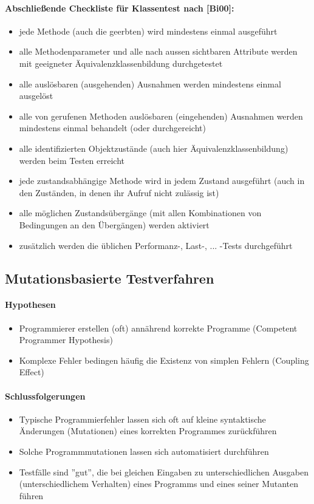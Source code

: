 \paragraph{Abschließende Checkliste für Klassentest nach [Bi00]:}
\begin{itemize}
	\item jede Methode (auch die geerbten) wird mindestens einmal ausgeführt
	\item  alle Methodenparameter und alle nach aussen sichtbaren Attribute werden mit geeigneter Äquivalenzklassenbildung durchgetestet
	\item alle auslösbaren (ausgehenden) Ausnahmen werden mindestens einmal ausgelöst
	\item alle von gerufenen Methoden auslösbaren (eingehenden) Ausnahmen werden mindestens einmal behandelt (oder durchgereicht)
	\item alle identifizierten Objektzustände (auch hier Äquivalenzklassenbildung) werden beim Testen erreicht
	\item jede zustandsabhängige Methode wird in jedem Zustand ausgeführt (auch in den Zuständen, in denen ihr Aufruf nicht zulässig ist)
	\item alle möglichen Zustandsübergänge (mit allen Kombinationen von Bedingungen an den Übergängen) werden aktiviert
	\item zusätzlich werden die üblichen Performanz-, Last-, ... -Tests durchgeführt
\end{itemize}

\subsection{Mutationsbasierte Testverfahren}

\paragraph{Hypothesen}
\begin{itemize}
	\item Programmierer erstellen (oft) annährend korrekte Programme (Competent Programmer Hypothesis)
	\item Komplexe Fehler bedingen häufig die Existenz von simplen Fehlern (Coupling Effect)
\end{itemize}
\paragraph{Schlussfolgerungen}
\begin{itemize}
	\item Typische Programmierfehler lassen sich oft auf kleine syntaktische Änderungen (Mutationen) eines korrekten Programmes zurückführen
	\item Solche Programmmutationen lassen sich automatisiert durchführen
	\item Testfälle sind ''gut'', die bei gleichen Eingaben zu unterschiedlichen Ausgaben (unterschiedlichem Verhalten) eines Programms und eines seiner Mutanten führen
\end{itemize}

